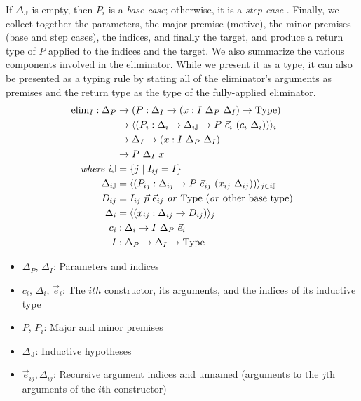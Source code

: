 \documentclass{report}
\newcommand{\const}[1]{\text{#1}}
\newcommand{\Type}{\const{Type}}
\begin{document}
If $\Delta_{\mathbb{J}}$ is empty, then $P_i$ is a \emph{base case}; otherwise, it is a \emph{step case} \citep{inductive-families}. Finally, we collect together the parameters, the major premise (motive), the minor premises (base and step cases), the indices, and finally the target, and produce a return type of $P$ applied to the indices and the target. We also summarize the various components involved in the eliminator. While we present it as a type, it can also be presented as a typing rule by stating all of the eliminator's arguments as premises and the return type as the type of the fully-applied eliminator.
%
\begin{align*}
    \const{elim}_I : \Delta_P &\to (P : \Delta_I \to (x : I ~ \Delta_P ~ \Delta_I) \to \Type) \\
    &\to \langle (P_i: \Delta_i \to \Delta_{i\mathbb{J}} \to P ~ \Vec{e}_i ~ (c_i ~ \Delta_i)) \rangle_i \\
    &\to \Delta_I \to (x: I ~ \Delta_P ~ \Delta_I) \\
    &\to P ~ \Delta_I ~ x \\
    \text{\emph{where}} ~ i\mathbb{J} &= \{ j \mid I_{ij} = I \} \\
    \Delta_{i\mathbb{J}} &= \langle (P_{ij} : \Delta_{ij} \to P ~ \Vec{e}_{ij} ~ (x_{ij} ~ \Delta_{ij})) \rangle_{j \in i\mathbb{J}} \\
    D_{ij} &= I_{ij} ~ \Vec{p} ~ \Vec{e}_{ij} ~ \text{\emph{or}} ~ \Type ~ (\text{\emph{or} other base type})\\
    \Delta_i &= \langle (x_{ij} : \Delta_{ij} \to D_{ij}) \rangle_j \\
    c_i &: \Delta_i \to I ~ \Delta_P ~ \Vec{e}_i \\
    I &: \Delta_P \to \Delta_I \to \Type
\end{align*}
%
\begin{itemize}
    \item $\Delta_P$, $\Delta_I$: Parameters and indices
    \item $c_i$, $\Delta_i$, $\Vec{e}_i$: The $ith$ constructor, its arguments, and the indices of its inductive type
    \item $P$, $P_i$: Major and minor premises
    \item $\Delta_{\mathbb{J}}$: Inductive hypotheses
    \item $\Vec{e}_{ij}, \Delta_{ij}$: Recursive argument indices and unnamed (arguments to the $j$th arguments of the $i$th constructor)
\end{itemize}
\end{document}
